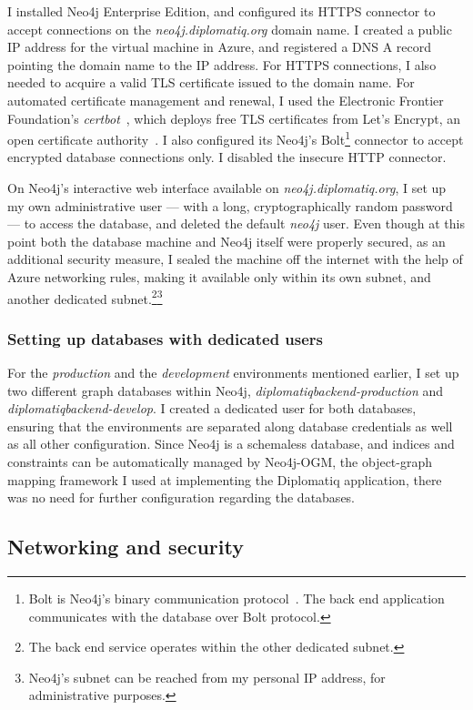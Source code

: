 I installed Neo4j Enterprise Edition, and configured its HTTPS connector to accept connections on the \emph{neo4j.diplomatiq.org} domain name. I created a public IP address for the virtual machine in Azure, and registered a DNS A record pointing the domain name to the IP address. For HTTPS connections, I also needed to acquire a valid TLS certificate issued to the domain name. For automated certificate management and renewal, I used the Electronic Frontier Foundation's \emph{certbot}~\cite{certbot}, which deploys free TLS certificates from Let's Encrypt, an open certificate authority~\cite{letsencrypt}. I also configured its Neo4j's Bolt\footnote{Bolt is Neo4j's binary communication protocol~\cite{boltprotocol}. The back end application communicates with the database over Bolt protocol.} connector to accept encrypted database connections only. I disabled the insecure HTTP connector.

On Neo4j's interactive web interface available on \emph{neo4j.diplomatiq.org}, I set up my own administrative user — with a long, cryptographically random password — to access the database, and deleted the default \emph{neo4j} user. Even though at this point both the database machine and Neo4j itself were properly secured, as an additional security measure, I sealed the machine off the internet with the help of Azure networking rules, making it available only within its own subnet, and another dedicated subnet.\footnote{The back end service operates within the other dedicated subnet.}\footnote{Neo4j's subnet can be reached from my personal IP address, for administrative purposes.}

\subsubsection{Setting up databases with dedicated users}

For the \emph{production} and the \emph{development} environments mentioned earlier, I set up two different graph databases within Neo4j, \emph{diplomatiqbackend-production} and \emph{diplomatiqbackend-develop}. I created a dedicated user for both databases, ensuring that the environments are separated along database credentials as well as all other configuration. Since Neo4j is a schemaless database, and indices and constraints can be automatically managed by Neo4j-OGM, the object-graph mapping framework I used at implementing the Diplomatiq application, there was no need for further configuration regarding the databases.

\subsection{Networking and security}

